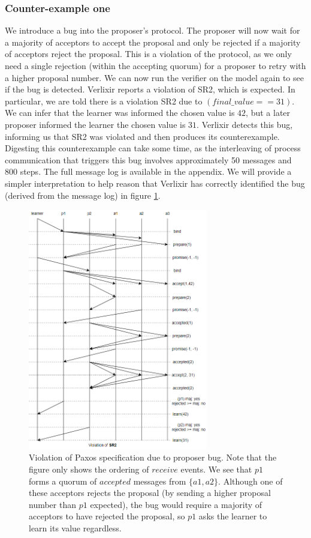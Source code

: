 \subsubsection{Counter-example one}
We introduce a bug into the proposer's protocol. The proposer will now wait for a majority of acceptors to accept the proposal and only be rejected if a majority of acceptors reject the proposal. This is a violation of the protocol, as we only need a single rejection (within the accepting quorum) for a proposer to retry with a higher proposal number. We can now run the verifier on the model again to see if the bug is detected. Verlixir reports a violation of SR2, which is expected. In particular, we are told there is a violation SR2 due to $( final\_value == 31 )$. We can infer that the learner was informed the chosen value is $42$, but a later proposer informed the learner the chosen value is $31$. Verlixir detects this bug, informing us that SR2 was violated and then produces its counterexample. Digesting this counterexample can take some time, as the interleaving of process communication that triggers this bug involves approximately 50 messages and 800 steps. The full message log is available in the appendix. We will provide a simpler interpretation to help reason that Verlixir has correctly identified the bug (derived from the message log) in figure \ref{fig:Paxos_1}.
\begin{figure}[h]
    \centering
    \includegraphics[width=0.7\textwidth]{images/Paxos_2.png}
    \caption{Violation of Paxos specification due to proposer bug. Note that the figure only shows the ordering of $receive$ events. We see that $p1$ forms a quorum of $accepted$ messages from $\{a1, a2\}$. Although one of these acceptors rejects the proposal (by sending a higher proposal number than $p1$ expected), the bug would require a majority of acceptors to have rejected the proposal, so $p1$ asks the learner to learn its value regardless.}
    \label{fig:Paxos_1}
\end{figure}
